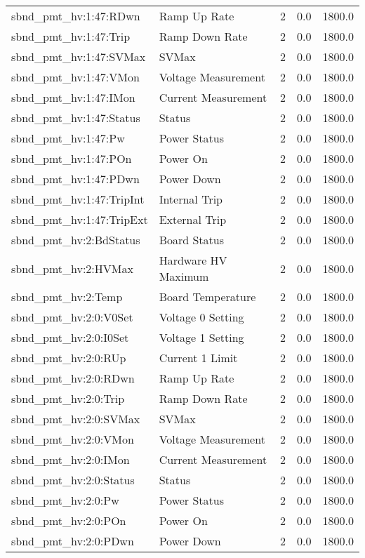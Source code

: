 \begin{center}
\begin{longtable}{l | l l l l }
sbnd\_pmt\_hv:1:47:RDwn & Ramp Up Rate & 2 & 0.0 & 1800.0\\ 
sbnd\_pmt\_hv:1:47:Trip & Ramp Down Rate & 2 & 0.0 & 1800.0\\ 
sbnd\_pmt\_hv:1:47:SVMax & SVMax & 2 & 0.0 & 1800.0\\ 
sbnd\_pmt\_hv:1:47:VMon & Voltage Measurement & 2 & 0.0 & 1800.0\\ 
sbnd\_pmt\_hv:1:47:IMon & Current Measurement & 2 & 0.0 & 1800.0\\ 
sbnd\_pmt\_hv:1:47:Status & Status & 2 & 0.0 & 1800.0\\ 
sbnd\_pmt\_hv:1:47:Pw & Power Status & 2 & 0.0 & 1800.0\\ 
sbnd\_pmt\_hv:1:47:POn & Power On & 2 & 0.0 & 1800.0\\ 
sbnd\_pmt\_hv:1:47:PDwn & Power Down & 2 & 0.0 & 1800.0\\ 
sbnd\_pmt\_hv:1:47:TripInt & Internal Trip & 2 & 0.0 & 1800.0\\ 
sbnd\_pmt\_hv:1:47:TripExt & External Trip & 2 & 0.0 & 1800.0\\ 
sbnd\_pmt\_hv:2:BdStatus & Board Status & 2 & 0.0 & 1800.0\\ 
sbnd\_pmt\_hv:2:HVMax & Hardware HV Maximum & 2 & 0.0 & 1800.0\\ 
sbnd\_pmt\_hv:2:Temp & Board Temperature & 2 & 0.0 & 1800.0\\ 
sbnd\_pmt\_hv:2:0:V0Set & Voltage 0 Setting & 2 & 0.0 & 1800.0\\ 
sbnd\_pmt\_hv:2:0:I0Set & Voltage 1 Setting & 2 & 0.0 & 1800.0\\ 
sbnd\_pmt\_hv:2:0:RUp & Current 1 Limit & 2 & 0.0 & 1800.0\\ 
sbnd\_pmt\_hv:2:0:RDwn & Ramp Up Rate & 2 & 0.0 & 1800.0\\ 
sbnd\_pmt\_hv:2:0:Trip & Ramp Down Rate & 2 & 0.0 & 1800.0\\ 
sbnd\_pmt\_hv:2:0:SVMax & SVMax & 2 & 0.0 & 1800.0\\ 
sbnd\_pmt\_hv:2:0:VMon & Voltage Measurement & 2 & 0.0 & 1800.0\\ 
sbnd\_pmt\_hv:2:0:IMon & Current Measurement & 2 & 0.0 & 1800.0\\ 
sbnd\_pmt\_hv:2:0:Status & Status & 2 & 0.0 & 1800.0\\ 
sbnd\_pmt\_hv:2:0:Pw & Power Status & 2 & 0.0 & 1800.0\\ 
sbnd\_pmt\_hv:2:0:POn & Power On & 2 & 0.0 & 1800.0\\ 
sbnd\_pmt\_hv:2:0:PDwn & Power Down & 2 & 0.0 & 1800.0\\ 

\end{longtable}
\end{center}
